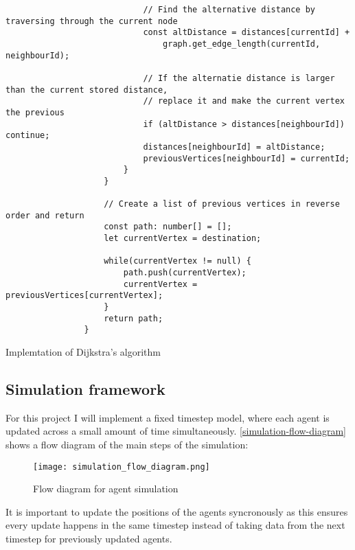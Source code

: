 \begin{listing}
\begin{verbatim}
                            // Find the alternative distance by traversing through the current node
                            const altDistance = distances[currentId] +
                                graph.get_edge_length(currentId, neighbourId);

                            // If the alternatie distance is larger than the current stored distance,
                            // replace it and make the current vertex the previous
                            if (altDistance > distances[neighbourId]) continue;
                            distances[neighbourId] = altDistance;
                            previousVertices[neighbourId] = currentId;
                        }
                    }

                    // Create a list of previous vertices in reverse order and return
                    const path: number[] = [];
                    let currentVertex = destination;

                    while(currentVertex != null) {
                        path.push(currentVertex);
                        currentVertex = previousVertices[currentVertex];
                    }
                    return path;
                }
            \end{verbatim}
            \caption{Implemtation of Dijkstra's algorithm}
            \label{Dijkstra-implementation}
        \end{listing}

    \subsection{Simulation framework}

        For this project I will implement a fixed timestep model, where each agent is updated across a small amount of time simultaneously. \autoref{simulation-flow-diagram} shows a flow diagram of the main steps of the simulation:

        \begin{figure}
            \centering
            \texttt{[image: simulation\_flow\_diagram.png]}
            \caption{Flow diagram for agent simulation}
            \label{simulation-flow-diagram}
        \end{figure}

        It is important to update the positions of the agents syncronously as this ensures every update happens in the same timestep instead of taking data from the next timestep for previously updated agents.

